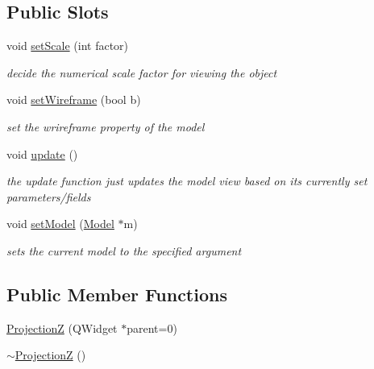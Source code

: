 \subsection*{Public Slots}
\begin{DoxyCompactItemize}
\item 
void \mbox{\hyperlink{class_projection_z_a21e56fe128f64983203888507845847d}{set\+Scale}} (int factor)
\begin{DoxyCompactList}\small\item\em decide the numerical scale factor for viewing the object \end{DoxyCompactList}\item 
void \mbox{\hyperlink{class_projection_z_a61a7115d258f9324b5f697983dd5ca3d}{set\+Wireframe}} (bool b)
\begin{DoxyCompactList}\small\item\em set the wrireframe property of the model \end{DoxyCompactList}\item 
void \mbox{\hyperlink{class_projection_z_abf7cbd3b5479c7805fbceecf3c68b0be}{update}} ()
\begin{DoxyCompactList}\small\item\em the update function just updates the model view based on its currently set parameters/fields \end{DoxyCompactList}\item 
void \mbox{\hyperlink{class_projection_z_af65afd9bf93b40bbf626cd2fba303b3f}{set\+Model}} (\mbox{\hyperlink{class_model}{Model}} $\ast$m)
\begin{DoxyCompactList}\small\item\em sets the current model to the specified argument \end{DoxyCompactList}\end{DoxyCompactItemize}
\subsection*{Public Member Functions}
\begin{DoxyCompactItemize}
\item 
\mbox{\hyperlink{class_projection_z_ac812d46606329365a4e877b6cc58d86d}{ProjectionZ}} (Q\+Widget $\ast$parent=0)
\item 
\mbox{\hyperlink{class_projection_z_a5d1f4701bf63635f88924761f26ce173}{$\sim$\+ProjectionZ}} ()
\end{DoxyCompactItemize}
